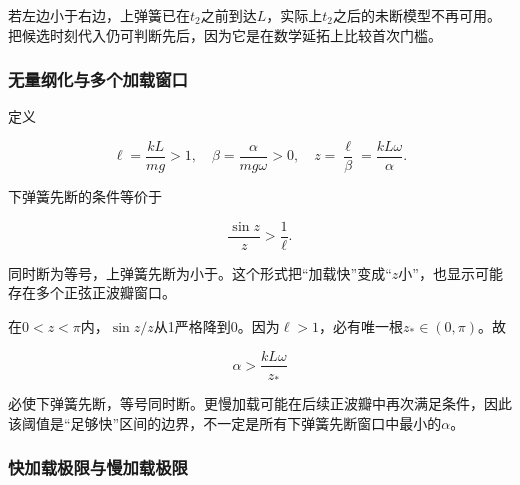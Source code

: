 \documentclass[12pt,a4paper,fontset=fandol]{ctexart}
\begin{document}
若左边小于右边，上弹簧已在\(t_2\)之前到达\(L\)，实际上\(t_2\)之后的未断模型不再可用。把候选时刻代入仍可判断先后，因为它是在数学延拓上比较首次门槛。

\subsubsection{无量纲化与多个加载窗口}\label{ux65e0ux91cfux7eb2ux5316ux4e0eux591aux4e2aux52a0ux8f7dux7a97ux53e3}

定义

\[
\ell=\frac{kL}{mg}>1,\quad
\beta=\frac{\alpha}{mg\omega}>0,\quad
z=\frac{\ell}{\beta}=\frac{kL\omega}{\alpha}.
\]

下弹簧先断的条件等价于

\[
\boxed{\frac{\sin z}{z}>\frac1\ell}.
\]

同时断为等号，上弹簧先断为小于。这个形式把``加载快''变成``\(z\)小''，也显示可能存在多个正弦正波瓣窗口。

\begin{center}
\begin{minipage}{\linewidth}
\centering\begingroup{}
\ifdim\wd\diagrambox>.88\linewidth
\sbox{\diagrambox}{\resizebox{.88\linewidth}{!}{\usebox{\diagrambox}}}\fi
\ifdim\ht\diagrambox>.38\textheight
\resizebox{!}{.38\textheight}{\usebox{\diagrambox}}
\else\usebox{\diagrambox}\fi
\par{}\endgroup\end{minipage}\end{center}

在\(0<z<\pi\)内，\(\sin z/z\)从1严格降到0。因为\(\ell>1\)，必有唯一根\(z_*\in(0,\pi)\)。故

\[
\alpha>\frac{kL\omega}{z_*}
\]

必使下弹簧先断，等号同时断。更慢加载可能在后续正波瓣中再次满足条件，因此该阈值是``足够快''区间的边界，不一定是所有下弹簧先断窗口中最小的\(\alpha\)。

\subsubsection{快加载极限与慢加载极限}\label{ux5febux52a0ux8f7dux6781ux9650ux4e0eux6162ux52a0ux8f7dux6781ux9650}
\end{document}
